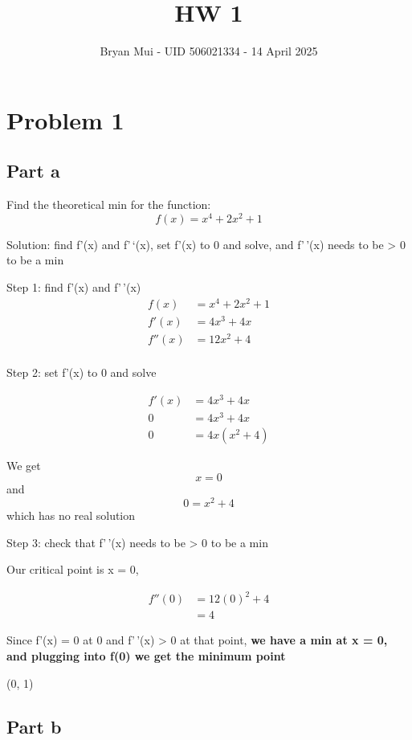 \documentclass[
  letterpaper,
  DIV=11,
  numbers=noendperiod]{scrartcl}
\title{HW 1}
\author{Bryan Mui - UID 506021334 - 14 April 2025}
\date{}
\begin{document}
\maketitle


\section{Problem 1}\label{problem-1}

\subsection{Part a}\label{part-a}

Find the theoretical min for the function: \[
f(x) = x^4 + 2x^2 + 1
\]

Solution: find f'(x) and f'\,`(x), set f'(x) to 0 and solve, and
f'\,'(x) needs to be \textgreater{} 0 to be a min

Step 1: find f'(x) and f'\,'(x) \begin{align}
  f(x) &= x^4 + 2x^2 + 1 \\ 
 f'(x) &= 4x^3 + 4x  \\
f''(x) &= 12x^2 + 4 \\
\end {align}

Step 2: set f'(x) to 0 and solve

\begin{align}
f'(x) &= 4x^3 + 4x  \\
    0 &= 4x^3 + 4x \\
    0 &= 4x(x^2 + 4)
\end{align}

We get \[x = 0\] and \[0 = x^2 +4\] which has no real solution

Step 3: check that f'\,'(x) needs to be \textgreater{} 0 to be a min

Our critical point is x = 0,

\begin{align}
f''(0)  &= 12(0)^2 + 4 \\
        &= 4
\end{align}

Since f'(x) = 0 at 0 and f'\,'(x) \textgreater{} 0 at that point,
\textbf{we have a min at x = 0, and plugging into f(0) we get the
minimum point}

\begin{center} (0, 1) \end{center}

\subsection{Part b}\label{part-b}
\end{document}
